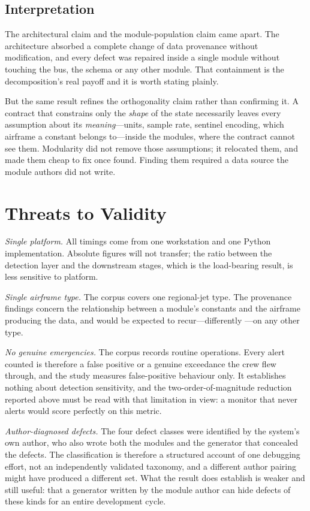 \documentclass[conference]{IEEEtran}
\begin{document}
\subsection{Interpretation}

The architectural claim and the module-population claim came apart. The
architecture absorbed a complete change of data provenance without
modification, and every defect was repaired inside a single module without
touching the bus, the schema or any other module. That containment is the
decomposition's real payoff and it is worth stating plainly.

But the same result refines the orthogonality claim rather than confirming it.
A contract that constrains only the \emph{shape} of the state necessarily
leaves every assumption about its \emph{meaning}---units, sample rate, sentinel
encoding, which airframe a constant belongs to---inside the modules, where the
contract cannot see them. Modularity did not remove those assumptions; it
relocated them, and made them cheap to fix once found. Finding them required a
data source the module authors did not write.

\section{Threats to Validity}
\label{sec:threats}

\textit{Single platform.} All timings come from one workstation and one
Python implementation. Absolute figures will not transfer; the ratio between
the detection layer and the downstream stages, which is the load-bearing
result, is less sensitive to platform.

\textit{Single airframe type.} The corpus covers one regional-jet type. The
provenance findings concern the relationship between a module's constants and
the airframe producing the data, and would be expected to recur---differently
---on any other type.

\textit{No genuine emergencies.} The corpus records routine operations. Every
alert counted is therefore a false positive or a genuine exceedance the crew
flew through, and the study measures false-positive behaviour only. It
establishes nothing about detection sensitivity, and the two-order-of-magnitude
reduction reported above must be read with that limitation in view: a monitor
that never alerts would score perfectly on this metric.

\textit{Author-diagnosed defects.} The four defect classes were identified by
the system's own author, who also wrote both the modules and the generator
that concealed the defects. The classification is therefore a structured
account of one debugging effort, not an independently validated taxonomy, and
a different author pairing might have produced a different set. What the
result does establish is weaker and still useful: that a generator written by
the module author can hide defects of these kinds for an entire development
cycle.
\end{document}
